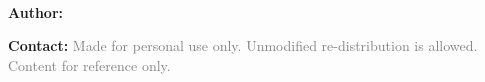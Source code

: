 \begin{titlepage}
    \null\vfill %

    \centering
    \Huge\textbf{\documentname}

    \vspace{0.1cm}
    \Large\textbf{\documenttype\ \documentdate}

    \vspace{1cm}
    \normalsize\textbf{Author:} \documentauthor

    \normalsize\textbf{Contact:} \documentauthorcontact
    \vfill %
    \textcolor{gray}{Made for personal use only. Unmodified re-distribution is allowed. Content for reference only.}
\end{titlepage}